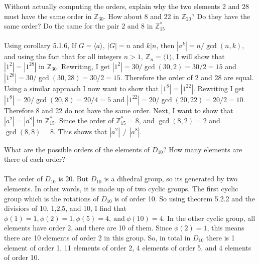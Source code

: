 \documentclass[titlepage]{article}
\newenvironment{problem}[2][Problem]{\begin{trivlist}
\item[\hskip \labelsep {\bfseries #1}\hskip \labelsep {\bfseries #2.}]}{\end{trivlist}}
\begin{document}
\begin{problem}{11}
Without actually computing the orders, explain why the two elements 2 and 28 must have the same order in $\mathbb{Z}_{30}$. How about 8 and 22 in $\mathbb{Z}_{20}$? Do they have the same order? Do the same for the pair 2 and 8 in $\mathbb{Z}^*_{15}$ \\ \\
Using corollary 5.1.6, If $G = \langle a \rangle, \ |G| = n$ and $k|n$, then $|a^k| = n/\gcd(n,k)$, and using the fact that for all integers $n > 1, \ \mathbb{Z}_n = \langle 1 \rangle$, I will show that $|1^2| = |1^{28}|$ in $\mathbb{Z}_{30}$. Rewriting, I get $|1^2| = 30/\gcd(30,2) = 30/2 = 15$ and $|1^{28}| = 30/\gcd(30,28) = 30/2 = 15$. Therefore the order of 2 and 28 are equal. Using a similar approach I now want to show that $|1^8| = |1^{22}|$. Rewriting I get $|1^8| = 20/\gcd(20,8) =20/4 = 5$ and $|1^{22}| = 20/\gcd(20,22) = 20/2 = 10$. Therefore 8 and 22 do not have the same order. Next, I want to show that $|a^2| = |a^8|$ in $\mathbb{Z}^*_{15}$. Since the order of $\mathbb{Z}^*_{15} = 8$, and $\gcd(8,2) = 2$ and $\gcd(8,8) = 8$. This shows that $|a^2| \neq |a^8|$.
\end{problem}
\begin{problem}{12}
What are the possible orders of the elements of $D_{10}$? How many elements are there of each order?
\\ \\
The order of $D_{10}$ is 20. But $D_{10}$ is a dihedral group, so its generated by two elements. In other words, it is made up of two cyclic groups. The first cyclic group which is the rotations of $D_{10}$ is of order 10. So using theorem 5.2.2 and the divisiors of 10, 1,2,5, and 10, I find that $\phi(1) = 1, \phi(2) = 1, \phi(5) = 4, \ \text{and} \ \phi(10) = 4$. In the other cyclic group, all elements have order 2, and there are 10 of them. Since $\phi(2) = 1$, this means there are 10 elements of order 2 in this group. So, in total in $D_{10}$ there is 1 element of order 1, 11 elements of order 2, 4 elements of order 5, and 4 elements of order 10.
\end{problem}
\end{document}
